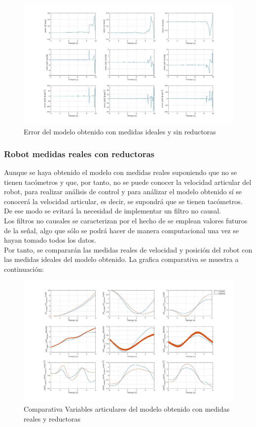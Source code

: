 \begin{figure}[h!]
	\centering
	\includegraphics[width=1\textwidth]{EstimacParam_SisModError_In1_IdealSR}
	\caption{Error del modelo obtenido con medidas ideales y sin reductoras}
\end{figure}

\subsubsection{Robot medidas reales con reductoras}
Aunque se haya obtenido el modelo con medidas reales suponiendo que no se tienen tacómetros y que, por tanto, no se puede conocer la velocidad articular del robot, para realizar análisis de control y para análizar el modelo obtenido sí se conocerá la velocidad articular, es decir, se supondrá que se tienen tacómetros. De ese modo se evitará la necesidad de implementar un filtro no causal. \\
Los filtros no causales se caracterizan por el hecho de se emplean valores futuros de la señal, algo que sólo se podrá hacer de manera computacional una vez se hayan tomado todos los datos.\\

Por tanto, se compararán las medidas reales de velocidad y posición del robot con las medidas ideales del modelo obtenido. La grafica comparativa se muestra a continuación:

\begin{figure}[h!]
	\centering
	\includegraphics[width=1\textwidth]{EstimacParam_SisMod_In1_RealCR}
	\caption{Comparativa Variables articulares del modelo obtenido con medidas reales y reductoras}
\end{figure}

